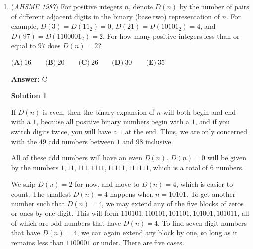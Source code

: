 \begin{enumerate}
 \textbf{Answer: }B



\textbf{Solution}

Define a super-special number to be a number whose decimal expansion only consists of $0$'s and $1$'s. The problem is equivalent to finding the number of super-special numbers necessary to add up to $\frac{1}{7}=0.142857142857\hdots$. This can be done in $8$ numbers if we take
 \[0.111111\hdots, 0.011111\hdots, 0.010111\hdots, 0.010111\hdots, 0.000111\hdots, 0.000101\hdots, 0.000101\hdots, 0.000100\hdots\]Now assume for sake of contradiction that we can do this with strictly less than $8$ super-special numbers (in particular, less than $10$.) Then the result of the addition won't have any carry over, so each digit is simply the number of super-special numbers which had a $1$ in that place. This means that in order to obtain the $8$ in $0.1428\hdots$, there must be $8$ super-special numbers, so the answer is $\boxed{\textbf{(B)}\ 8}$.

 


	\item (\textit{AHSME 1997}) For positive integers $n$, denote $D(n)$ by the number of pairs of different adjacent digits in the binary (base two) representation of $n$. For example, $D(3) = D(11_{2}) = 0$, $D(21) = D(10101_{2}) = 4$, and $D(97) = D(1100001_{2}) = 2$. For how many positive integers less than or equal to $97$ does $D(n) = 2$?


 $\textbf{(A)}\ 16\qquad\textbf{(B)}\ 20\qquad\textbf{(C)}\ 26\qquad\textbf{(D)}\ 30\qquad\textbf{(E)}\ 35$

 \textbf{Answer: }C



\textbf{Solution 1}

If $D(n)$ is even, then the binary expansion of $n$ will both begin and end with a $1$, because all positive binary numbers begin with a $1$, and if you switch digits twice, you will have a $1$ at the end.  Thus, we are only concerned with the $49$ odd numbers between $1$ and $98$ inclusive.

 All of these odd numbers will have an even $D(n)$.  $D(n) = 0$ will be given by the numbers $1, 11, 111, 1111, 11111, 111111$, which is a total of $6$ numbers.

 We skip $D(n) = 2$ for now, and move to $D(n) = 4$, which is easier to count.  The smallest $D(n) = 4$ happens when $n = 10101$.  To get another number such that $D(n) = 4$, we may extend any of the five blocks of zeros or ones by one digit.  This will form $110101, 100101, 101101, 101001, 101011$, all of which are odd numbers that have $D(n) = 4$.  To find seven digit numbers that have $D(n) = 4$, we can again extend any block by one, so long as it remains less than $1100001$ or under.  There are five cases.


\end{enumerate}
